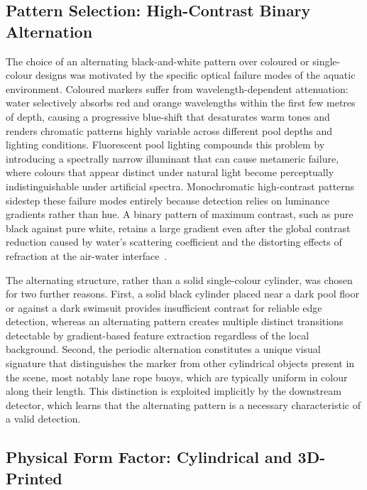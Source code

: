 \subsection{Pattern Selection: High-Contrast Binary Alternation}

The choice of an alternating black-and-white pattern over coloured or single-colour designs was
motivated by the specific optical failure modes of the aquatic environment. Coloured markers
suffer from wavelength-dependent attenuation: water selectively absorbs red and orange
wavelengths within the first few metres of depth, causing a progressive blue-shift that
desaturates warm tones and renders chromatic patterns highly variable across different pool
depths and lighting conditions. Fluorescent pool lighting compounds this problem by introducing
a spectrally narrow illuminant that can cause metameric failure, where colours that appear
distinct under natural light become perceptually indistinguishable under artificial spectra.
Monochromatic high-contrast patterns sidestep these failure modes entirely because detection
relies on luminance gradients rather than hue. A binary pattern of maximum contrast, such as pure
black against pure white, retains a large gradient even after the global contrast reduction
caused by water's scattering coefficient and the distorting effects of refraction at the
air-water interface~\cite{agrawal2012theory}.

The alternating structure, rather than a solid single-colour cylinder, was chosen for two
further reasons. First, a solid black cylinder placed near a dark pool floor or against a dark
swimsuit provides insufficient contrast for reliable edge detection, whereas an alternating
pattern creates multiple distinct transitions detectable by gradient-based feature extraction
regardless of the local background. Second, the periodic alternation constitutes a unique
visual signature that distinguishes the marker from other cylindrical objects present in the
scene, most notably lane rope buoys, which are typically uniform in colour along their length.
This distinction is exploited implicitly by the downstream detector, which learns that the
alternating pattern is a necessary characteristic of a valid detection.

\subsection{Physical Form Factor: Cylindrical and 3D-Printed}

